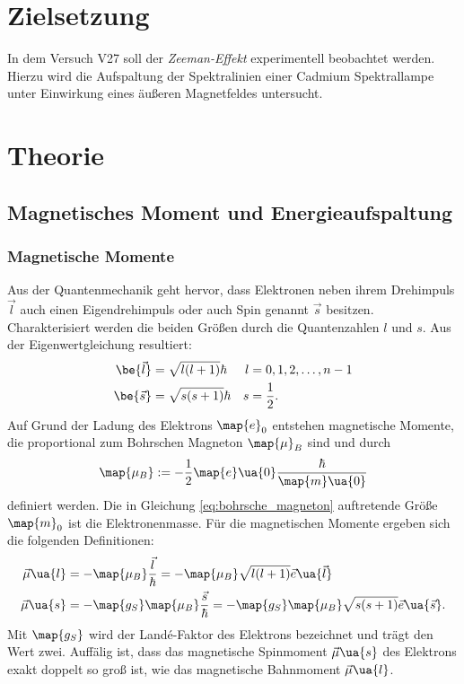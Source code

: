 \setcounter{page}{1}
\section*{Zielsetzung}
In dem Versuch V27 soll der \emph{Zeeman-Effekt} experimentell beobachtet werden. %
Hierzu wird die Aufspaltung der Spektralinien einer Cadmium Spektrallampe %
unter Einwirkung eines äußeren Magnetfeldes untersucht.

\section{Theorie}

\subsection{Magnetisches Moment und Energieaufspaltung}
\subsubsection{Magnetische Momente}
Aus der Quantenmechanik geht hervor, dass Elektronen neben ihrem Drehimpuls $\vec{l}$ auch einen
Eigendrehimpuls oder auch Spin genannt $\vec{s}$ besitzen. Charakterisiert werden die beiden Größen durch die
Quantenzahlen $l$ und $s$. Aus der Eigenwertgleichung resultiert:
\begin{align*}
\be{\vec{l}}&=\sqrt{l(l+1)}\hbar & l&=0,1,2,\dots,n-1\\
\be{\vec{s}}&=\sqrt{s(s+1)}\hbar & s&=\frac{1}{2}.
\end{align*}
Auf Grund der Ladung des Elektrons $\map{e}_0$ entstehen magnetische Momente, die
proportional zum Bohrschen Magneton $\map{\mu}_B$ sind und durch
\begin{equation}
  \label{eq:bohrsche_magneton}
  \map{\mu_B}:=-\frac{1}{2}\map{e}\ua{0} \frac{\hbar}{\map{m}\ua{0}}
\end{equation}
definiert werden. Die in Gleichung \eqref{eq:bohrsche_magneton} auftretende Größe $\map{m}_0$ ist die Elektronenmasse.
Für die magnetischen Momente ergeben sich die folgenden Definitionen:
\begin{align*}
  \vec{\mu}\ua{l}&=-\map{\mu_B}\frac{\vec{l}}{\hbar}=-\map{\mu_B}\sqrt{l(l+1)}\vec{e}\ua{\vec{l}} \\
  \vec{\mu}\ua{s}&=-\map{g_S}\map{\mu_B}\frac{\vec{s}}{\hbar}=-\map{g_S}\map{\mu_B}\sqrt{s(s+1)}\vec{e}\ua{\vec{s}}.
\end{align*}
Mit $\map{g_S}$ wird der Landé-Faktor des Elektrons bezeichnet und trägt den Wert zwei. %
Auffälig ist, dass das magnetische Spinmoment $\vec{\mu}\ua{s}$ des Elektrons exakt doppelt %
so groß ist, wie das magnetische Bahnmoment $\vec{\mu}\ua{l}$. %

